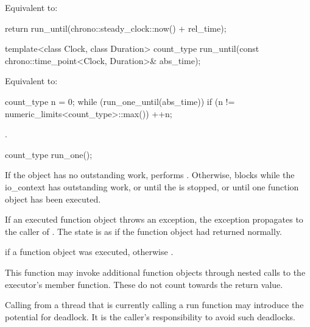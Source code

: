 \begin{itemdescr}
\pnum
\effects Equivalent to:
\begin{codeblock}
return run_until(chrono::steady_clock::now() + rel_time);
\end{codeblock}

\end{itemdescr}

%
\begin{itemdecl}
template<class Clock, class Duration>
  count_type run_until(const chrono::time_point<Clock, Duration>& abs_time);
\end{itemdecl}

\begin{itemdescr}
\pnum
\effects Equivalent to:
\begin{codeblock}
count_type n = 0;
while (run_one_until(abs_time))
  if (n != numeric_limits<count_type>::max())
    ++n;
\end{codeblock}


\pnum
\returns {}.
\end{itemdescr}

%
\begin{itemdecl}
count_type run_one();
\end{itemdecl}

\begin{itemdescr}
\pnum
\effects If the  object has no outstanding work, performs . Otherwise, blocks while the io_context has outstanding work, or until the  is stopped, or until one function object has been executed.

\pnum
If an executed function object throws an exception, the exception propagates to the caller of . The  state is as if the function object had returned normally.

\pnum
\returns {} if a function object was executed, otherwise .

\pnum
\remarks This function may invoke additional function objects through nested calls to the  executor's  member function. These do not count towards the return value.

\pnum
\begin{note}
Calling  from a thread that is currently calling a run function
may introduce the potential for deadlock.
It is the caller's responsibility to avoid such deadlocks.
\end{note}
\end{itemdescr}


